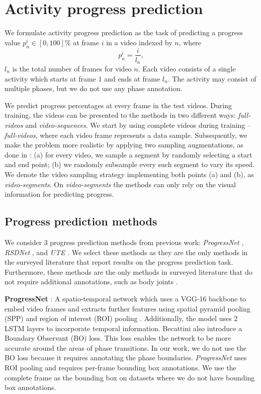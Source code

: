 \section{Activity progress prediction}
\label{sec:method}
We formulate activity progress prediction as the task of predicting a progress value $p_n^i \in [0, 100]\%$ at frame $i$ in a video indexed by $n$, where
\begin{equation}
  p_n^i = \frac{i}{l_n},
  \label{eq:progress}
\end{equation}
$l_n$ is the total number of frames for video $n$. 
Each video consists of a single activity which starts at frame $1$ and ends at frame $l_n$. 
The activity may consist of multiple phases, but we do not use any phase annotation. 

We predict progress percentages at every frame in the test videos.
During training, the videos can be presented to the methods in two different ways: \textsl{full-videos} and \textsl{video-sequences}. 
We start by using complete videos during training -- \textsl{full-videos}, where each video frame represents a data sample.
Subsequently, we make the problem more realistic by applying two sampling augmentations, as done in \cite{becattini2017}: 
(a) for every video, we sample a segment by randomly selecting a start and end point; 
(b) we randomly subsample every such segment to vary its speed. 
We denote the video sampling strategy implementing both points (a) and (b), as \textsl{video-segments}. 
On \textsl{video-segments} the methods can only rely on the visual information for predicting progress. 

\subsection{Progress prediction methods}
\label{sec:progress_prediction_methods}
We consider 3 progress prediction methods from previous work: \textsl{ProgressNet} \cite{becattini2017}, \textsl{RSDNet} \cite{twinanda2019}, and \textsl{UTE} \cite{kukleva2019}. 
We select these methods as they are the only methods in the surveyed literature that report results on the progress prediction task. 
Furthermore, these methods are the only methods in surveyed literature that do not require additional annotations, such as body joints \cite{pucci2023}.

\smallskip\noindent\textbf{ProgressNet} \cite{becattini2017}: 
A spatio-temporal network which uses a VGG-16 \cite{simonyan2015} backbone to embed video frames and extracts further features using spatial pyramid pooling (SPP) \cite{he2014} and region of interest (ROI) pooling \cite{girshick2015}. 
Additionally, the model uses 2 LSTM layers to incorporate temporal information. 
Becattini \etal also introduce a Boundary Observant (BO) loss. 
This loss enables the network to be more accurate around the areas of phase transitions. 
In our work, we do not use the BO loss because it requires annotating the phase boundaries. 
\textsl{ProgressNet} uses ROI pooling and requires per-frame bounding box annotations. We use the complete frame as the bounding box on datasets where we do not have bounding box annotations.

